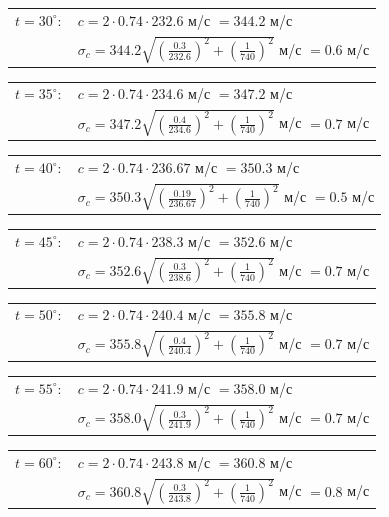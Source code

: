 \documentclass[12pt]{article}
\begin{document}
\noindent\begin{tabular}{l@{~~~}l}
$t = 30^\circ:$ & $c = 2 \cdot 0.74 \cdot 232.6$ м/с $=344.2$ м/с \\
~ & $\sigma_c = 344.2 \sqrt{(\frac{0.3}{232.6})^2 + (\frac{1}{740})^2}$ м/с $ = 0.6$ м/с \\
\end{tabular}

\noindent\begin{tabular}{l@{~~~}l}
$t = 35^\circ:$ & $c = 2 \cdot 0.74 \cdot 234.6$ м/с $=347.2$ м/с \\
~ & $\sigma_c = 347.2 \sqrt{(\frac{0.4}{234.6})^2 + (\frac{1}{740})^2}$ м/с $ = 0.7$ м/с \\
\end{tabular}

\noindent\begin{tabular}{l@{~~~}l}
$t = 40^\circ:$ & $c = 2 \cdot 0.74 \cdot 236.67$ м/с $=350.3$ м/с \\
~ & $\sigma_c = 350.3 \sqrt{(\frac{0.19}{236.67})^2 + (\frac{1}{740})^2}$ м/с $ = 0.5$ м/с \\
\end{tabular}

\noindent\begin{tabular}{l@{~~~}l}
$t = 45^\circ:$ & $c = 2 \cdot 0.74 \cdot 238.3$ м/с $=352.6$ м/с \\
~ & $\sigma_c = 352.6 \sqrt{(\frac{0.3}{238.6})^2 + (\frac{1}{740})^2}$ м/с $ = 0.7$ м/с \\
\end{tabular}

\noindent\begin{tabular}{l@{~~~}l}
$t = 50^\circ:$ & $c = 2 \cdot 0.74 \cdot 240.4$ м/с $=355.8$ м/с \\
~ & $\sigma_c = 355.8 \sqrt{(\frac{0.4}{240.4})^2 + (\frac{1}{740})^2}$ м/с $ = 0.7$ м/с \\
\end{tabular}

\noindent\begin{tabular}{l@{~~~}l}
$t = 55^\circ:$ & $c = 2 \cdot 0.74 \cdot 241.9$ м/с $=358.0$ м/с \\
~ & $\sigma_c = 358.0 \sqrt{(\frac{0.3}{241.9})^2 + (\frac{1}{740})^2}$ м/с $ = 0.7$ м/с \\
\end{tabular}

\noindent\begin{tabular}{l@{~~~}l}
$t = 60^\circ:$ & $c = 2 \cdot 0.74 \cdot 243.8$ м/с $=360.8$ м/с \\
~ & $\sigma_c = 360.8 \sqrt{(\frac{0.3}{243.8})^2 + (\frac{1}{740})^2}$ м/с $ = 0.8$ м/с \\
\end{tabular}
\end{document}
